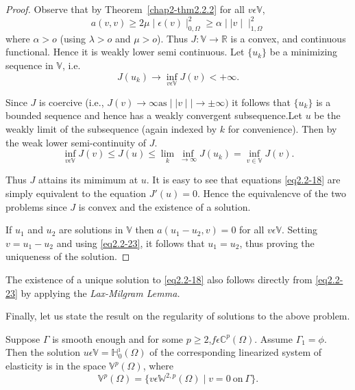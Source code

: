 \begin{proof}
Observe that by Theorem~\ref{chap2-thm2.2.2} for all $v \epsilon
\mathbb{V}$, 
\begin{equation*}
  a(v,v) \ge 2\mu \mid \epsilon (v) \mid ^2_{0,\Omega} \ge \alpha
  \mid \mid v \mid \mid ^2_{1,\Omega} \tag{2.2-23} \label{eq2.2-23}
\end{equation*}
where $\alpha > o$ (using $\lambda > o$ and $\mu > o$). Thus $J:
\mathbb{V}\to \mathbb{R}$ is a convex, and continuous
functional. Hence it is weakly lower semi continuous. Let $\{u_k\}$ be
a minimizing sequence in $\mathbb{V}$, i.e. 
$$
J(u_k)\to \inf\limits_{v \epsilon \mathbb{V}} J(v) < + \infty.
$$

Since $J$ is coercive (i.e., $J(v) \to \infty \text{as}\mid \mid v \mid
\mid \to \pm \infty )$ it follows that $\{u_k\}$ is a bounded sequence
and hence has a weakly convergent subsequence.\pageoriginale Let $u$ be the weakly
limit of the subsequence (again indexed by $k$ for convenience). Then
by the weak lower semi-continuity of $J$. 
$$
\inf\limits_{v \epsilon \mathbb{V}} J(v)\le J(u) \le
\lim\limits_k\inf\limits_{\to \infty} J(u_k)= \inf\limits_{v \in
  \mathbb{V}} J(v). 
$$

Thus $J$ attains its mimimum at $u$. It is easy to see that equations
\eqref{eq2.2-18} are simply equivalent to the equation $J'(u)=0$. Hence the
equivalencve of the two problems since $J$ is convex and the existence
of a solution. 

If $u_1$ and $u_2$ are solutions in $\mathbb{V}$ then $a(u_1-u_2,
v)=0$ for all $v \epsilon \mathbb{V}$. Setting $v=u_1-u_2$ and
using \eqref{eq2.2-23}, it follows that $u_1 = u_2$, thus proving the
uniqueness of the solution. 
\end{proof}

\begin{remark}\label{chap2-rem2.2.2}%
  The existence of a unique solution to \eqref{eq2.2-18} also follows directly
  from \eqref{eq2.2-23} by applying the {\em Lax-Milgram Lemma.} 
\end{remark}

Finally, let us state the result on the regularity of solutions to the
above problem. 

\begin{theorem}\label{chap2-thm2.2.4}%
  Suppose $\Gamma$ is smooth enough and for some $p \ge 2$,\break $f
  \epsilon \mathbb{C}^p (\Omega)$. Assume $\Gamma_1= \phi$. Then
  the solution $u \epsilon \mathbb{V} = \mathbb{H}^\imath_0 (\Omega)$ of
  the corresponding linearized system of elasticity is in the space
  $\mathbb{V}^p(\Omega)$, where  
  \begin{equation*}
    \mathbb{V}^p(\Omega) = \{v \epsilon \mathbb{W}^{2,p}(\Omega)
    \mid v = 0 ~\text{on}~ \Gamma\}.\tag{2.2-24} \label{eq2.2-24}
  \end{equation*}
\end{theorem}

